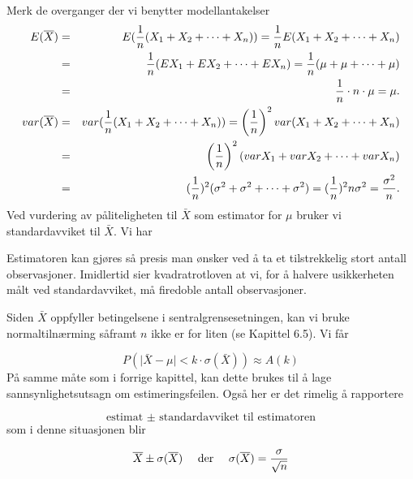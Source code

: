 Merk de overganger der vi benytter modellantakelser
\small
\begin{eqnarray*}
   E(\bar{X})&=&E({1\over n}(X_1+X_2+\cdots +X_n))=
              {1\over n}E(X_1+X_2+\cdots+ X_n)\\
             &=&{1\over n}(EX_1+EX_2+\cdots +EX_n)=
              {1\over n}(\mu+\mu+\cdots+ \mu)\\
             &=&{1\over n}\cdot n\cdot \mu=\mu.\\
 var(\bar X)&=&var({1\over n}(X_1+X_2+\cdots +X_n))
            =\left({1\over n}\right)^2var (X_1+X_2+\cdots +X_n)\\
            &=&\left({1\over n}\right)^2(varX_1+varX_2+\cdots +varX_n)\\
      &=&({1\over n})^2(\sigma ^2+\sigma ^2+\cdots +\sigma ^2)
            =({1\over n})^2n\sigma ^2 ={\sigma ^2\over n}.
\end{eqnarray*}
\normalsize
Ved vurdering av påliteligheten til $\bar X$ som estimator for $\mu$
bruker vi standardavviket til $\bar X$. Vi har
\begin{center}  \end{center}
Estimatoren kan gjøres så presis man ønsker ved å
ta et tilstrekkelig stort antall observasjoner.
Imidlertid sier kvadratrotloven at vi, for å halvere usikkerheten
 målt ved standardavviket, må firedoble antall observasjoner.

Siden $\bar{X}$ oppfyller betingelsene i sentralgrensesetningen, 
kan vi bruke normaltilnærming såframt $n$
ikke er for liten (se Kapittel 6.5). Vi får 

\[ P(\mid \bar X - \mu \mid < k\cdot \sigma (\bar X))\approx A(k)  \]
På samme måte som i forrige kapittel, kan dette brukes til
å lage sannsynlighetsutsagn om estimeringsfeilen. Også
her er det rimelig å rapportere

\[   \mbox{estimat $\pm$ standardavviket til estimatoren}   \]
som i denne situasjonen blir

\[ \bar X \pm \sigma (\bar X) \mbox{\ \ \ \ der \ \ \ } 
                       \sigma (\bar X)={\sigma \over \sqrt n}\]

